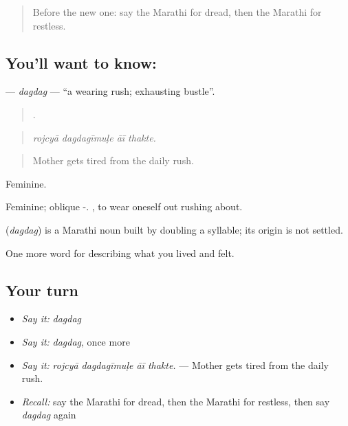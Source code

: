 \begin{quote}
Before the new one: say the Marathi for dread, then the Marathi for restless.
\end{quote}

\subsection*{You'll want to know: }
\textbf{} — \emph{dagdag} — \textquotedblleft{}a wearing rush; exhausting bustle\textquotedblright{}.

\begin{quote}
   .
\end{quote}

\begin{quote}
\emph{rojcyā dagdagīmuḷe āī thakte.}
\end{quote}

\begin{quote}
Mother gets tired from the daily rush.
\end{quote}

Feminine.

Feminine; oblique -.  , to wear oneself out rushing about.

\begin{cousinweb}
\textbf{} (\emph{dagdag}) is a Marathi noun built by doubling a syllable; its origin is not settled.
\end{cousinweb}

\begin{grammarlens}[title={What you've built}]
One more word for describing what you lived and felt.
\end{grammarlens}

\subsection*{Your turn}
\begin{itemize}
\raggedright
  \item \emph{Say it:} \emph{dagdag}
  \item \emph{Say it:} \emph{dagdag}, once more
  \item \emph{Say it:} \emph{rojcyā dagdagīmuḷe āī thakte.} — Mother gets tired from the daily rush.
  \item \emph{Recall:} say the Marathi for dread, then the Marathi for restless, then say \emph{dagdag} again
\end{itemize}

